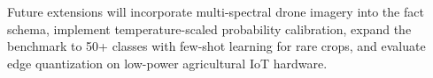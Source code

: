 \documentclass[conference,a4paper]{IEEEtran}
\begin{document}
Future extensions will incorporate multi-spectral drone imagery into the fact schema, implement temperature-scaled probability calibration, expand the benchmark to 50+ classes with few-shot learning for rare crops, and evaluate edge quantization on low-power agricultural IoT hardware.



\end{document}

